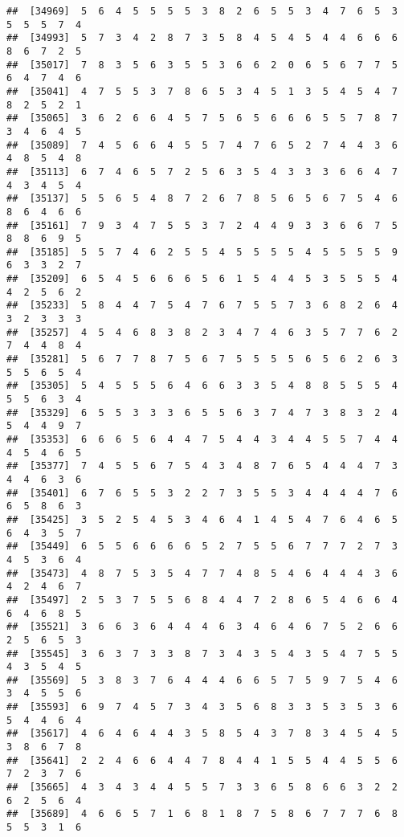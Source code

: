 \documentclass[
]{book}
\begin{document}
\begin{verbatim}
##  [34969]  5  6  4  5  5  5  5  3  8  2  6  5  5  3  4  7  6  5  3  5  5  5  7  4
##  [34993]  5  7  3  4  2  8  7  3  5  8  4  5  4  5  4  4  6  6  6  8  6  7  2  5
##  [35017]  7  8  3  5  6  3  5  5  3  6  6  2  0  6  5  6  7  7  5  6  4  7  4  6
##  [35041]  4  7  5  5  3  7  8  6  5  3  4  5  1  3  5  4  5  4  7  8  2  5  2  1
##  [35065]  3  6  2  6  6  4  5  7  5  6  5  6  6  6  5  5  7  8  7  3  4  6  4  5
##  [35089]  7  4  5  6  6  4  5  5  7  4  7  6  5  2  7  4  4  3  6  4  8  5  4  8
##  [35113]  6  7  4  6  5  7  2  5  6  3  5  4  3  3  3  6  6  4  7  4  3  4  5  4
##  [35137]  5  5  6  5  4  8  7  2  6  7  8  5  6  5  6  7  5  4  6  8  6  4  6  6
##  [35161]  7  9  3  4  7  5  5  3  7  2  4  4  9  3  3  6  6  7  5  8  8  6  9  5
##  [35185]  5  5  7  4  6  2  5  5  4  5  5  5  5  4  5  5  5  5  9  6  3  3  2  7
##  [35209]  6  5  4  5  6  6  6  5  6  1  5  4  4  5  3  5  5  5  4  4  2  5  6  2
##  [35233]  5  8  4  4  7  5  4  7  6  7  5  5  7  3  6  8  2  6  4  3  2  3  3  3
##  [35257]  4  5  4  6  8  3  8  2  3  4  7  4  6  3  5  7  7  6  2  7  4  4  8  4
##  [35281]  5  6  7  7  8  7  5  6  7  5  5  5  5  6  5  6  2  6  3  5  5  6  5  4
##  [35305]  5  4  5  5  5  6  4  6  6  3  3  5  4  8  8  5  5  5  4  5  5  6  3  4
##  [35329]  6  5  5  3  3  3  6  5  5  6  3  7  4  7  3  8  3  2  4  5  4  4  9  7
##  [35353]  6  6  6  5  6  4  4  7  5  4  4  3  4  4  5  5  7  4  4  4  5  4  6  5
##  [35377]  7  4  5  5  6  7  5  4  3  4  8  7  6  5  4  4  4  7  3  4  4  6  3  6
##  [35401]  6  7  6  5  5  3  2  2  7  3  5  5  3  4  4  4  4  7  6  6  5  8  6  3
##  [35425]  3  5  2  5  4  5  3  4  6  4  1  4  5  4  7  6  4  6  5  6  4  3  5  7
##  [35449]  6  5  5  6  6  6  6  5  2  7  5  5  6  7  7  7  2  7  3  4  5  3  6  4
##  [35473]  4  8  7  5  3  5  4  7  7  4  8  5  4  6  4  4  4  3  6  4  2  4  6  7
##  [35497]  2  5  3  7  5  5  6  8  4  4  7  2  8  6  5  4  6  6  4  6  4  6  8  5
##  [35521]  3  6  6  3  6  4  4  4  6  3  4  6  4  6  7  5  2  6  6  2  5  6  5  3
##  [35545]  3  6  3  7  3  3  8  7  3  4  3  5  4  3  5  4  7  5  5  4  3  5  4  5
##  [35569]  5  3  8  3  7  6  4  4  4  6  6  5  7  5  9  7  5  4  6  3  4  5  5  6
##  [35593]  6  9  7  4  5  7  3  4  3  5  6  8  3  3  5  3  5  3  6  5  4  4  6  4
##  [35617]  4  6  4  6  4  4  3  5  8  5  4  3  7  8  3  4  5  4  5  3  8  6  7  8
##  [35641]  2  2  4  6  6  4  4  7  8  4  4  1  5  5  4  4  5  5  6  7  2  3  7  6
##  [35665]  4  3  4  3  4  4  5  5  7  3  3  6  5  8  6  6  3  2  2  6  2  5  6  4
##  [35689]  4  6  6  5  7  1  6  8  1  8  7  5  8  6  7  7  7  6  8  5  5  3  1  6

\end{verbatim}
\end{document}
